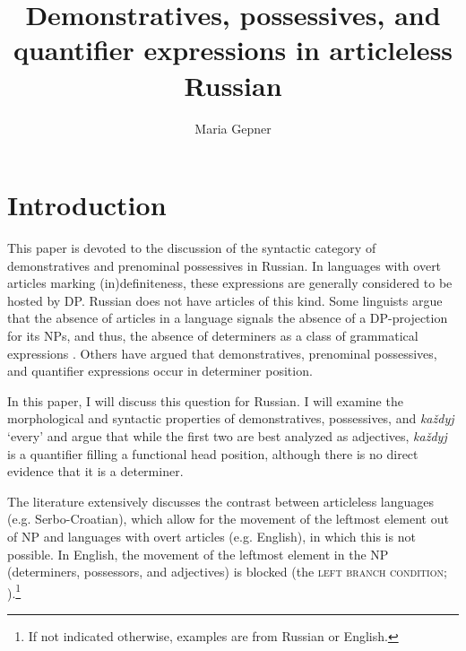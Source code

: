 \documentclass[output=paper,
colorlinks,
citecolor=brown,
newtxmath
]{langscibook}
\author{Maria Gepner\affiliation{Bar Ilan University}}
\title{Demonstratives, possessives, and quantifier expressions in articleless Russian}
\begin{document}
\maketitle

\section{Introduction}\label{introduction}
This paper is devoted to the discussion of the syntactic category of demonstratives and prenominal possessives in Russian. In languages with overt articles marking (in)definiteness, these expressions are generally considered to be hosted by DP. Russian does not have articles of this kind. Some linguists argue that the absence of articles in a language signals the absence of a DP-projection for its NPs, and thus, the absence of determiners as a class of grammatical expressions \citep{Boskovic2005a,Boskovic2007,Boskovic2009,Boskovic2010}. Others \citep{Engelhardt.Trugman1998,Rappaport2002,Franks.Pereltsvaig2004,Trugman2005,Trugman2007,Pereltsvaig2007} have argued that demonstratives, prenominal possessives, and quantifier expressions occur in determiner position.

In this paper, I will discuss this question for Russian. I will examine the morphological and syntactic properties of demonstratives, possessives, and \textit{každyj} `every' and argue that while the first two are best analyzed as adjectives, \textit{každyj} is a quantifier filling a functional head position, although there is no direct evidence that it is a determiner.

The literature extensively discusses the contrast between articleless languages (e.g. Serbo-Croatian), which allow for the movement of the leftmost element out of NP and languages with overt articles (e.g. English), in which this is not possible. In English, the movement of the leftmost element in the NP (determiners, possessors, and adjectives) is blocked (the \textsc{left branch condition}; \citealt{Ross1986}).\footnote{If not indicated otherwise, examples are from Russian or English.} 


\ea\label{whosefather}
\z\z
\end{document}
